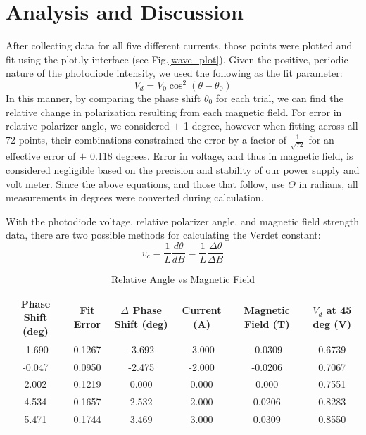 \documentclass[prb,preprint]{revtex4-1}
\begin{document}
\section{Analysis and Discussion}
After collecting data for all five different currents, those points were plotted and fit using the plot.ly interface (see Fig.\ref{wave_plot}). Given the positive, periodic nature of the photodiode intensity, we used the following as the fit parameter:
\begin{equation}
\label{volt eqn}
V_d = V_0 \cos^2(\theta -\theta _0)
\end{equation}
In this manner, by comparing the phase shift $\theta_0$ for each trial, we can find the relative change in polarization resulting from each magnetic field. For error in relative polarizer angle, we considered $\pm$ 1 degree, however when fitting across all 72 points, their combinations constrained the error by a factor of $\frac{1}{\sqrt{72}}$ for an effective error of $\pm$ 0.118 degrees. Error in voltage, and thus in magnetic field, is considered negligible based on the precision and stability of our power supply and volt meter. Since the above equations, and those that follow, use $\Theta$ in radians, all measurements in degrees were converted during calculation.

With the photodiode voltage, relative polarizer angle, and magnetic field strength data, there are two possible methods for calculating the Verdet constant:
\begin{equation}
\label{verdet eqn}
v_c=\frac{1}{L}\frac{d\theta }{dB}=\frac{1}{L}\frac{\Delta \theta }{\Delta B}
\end{equation}

\begin{table}[H]
\centering
\caption{Relative Angle vs Magnetic Field}


\renewcommand{\arraystretch}{1.8}
\begin{ruledtabular}
\begin{tabular}{c c c c c c}
Phase Shift (deg) & Fit Error & $\Delta$ Phase Shift (deg) & Current (A) & Magnetic Field (T) & $V_d$ at 45 deg (V)\\
\hline
-1.690 & 0.1267 & -3.692 & -3.000 & -0.0309 & 0.6739 \\
-0.047 & 0.0950 & -2.475 & -2.000 & -0.0206 & 0.7067 \\
2.002  & 0.1219 & 0.000  & 0.000 & 0.000   & 0.7551 \\
4.534  & 0.1657 & 2.532  & 2.000 & 0.0206  & 0.8283 \\
5.471  & 0.1744 & 3.469  & 3.000 & 0.0309  & 0.8550 \\
\end{tabular}
\end{ruledtabular}
\label{AnglevsB}
\end{table}
\end{document}
